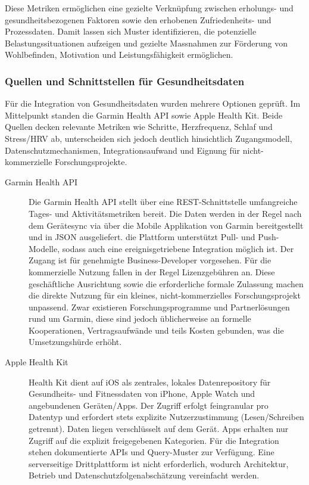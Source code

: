 \documentclass[12pt,a4paper]{report}
\begin{document}
Diese Metriken ermöglichen eine gezielte Verknüpfung zwischen erholungs- und gesundheitsbezogenen Faktoren sowie den erhobenen
Zufriedenheits- und Prozessdaten. Damit lassen sich Muster identifizieren, die potenzielle Belastungssituationen aufzeigen und 
gezielte Massnahmen zur Förderung von Wohlbefinden, Motivation und Leistungsfähigkeit ermöglichen.

\subsubsection{Quellen und Schnittstellen für Gesundheitsdaten}

Für die Integration von Gesundheitsdaten wurden mehrere Optionen geprüft. Im Mittelpunkt standen die Garmin Health API sowie Apple
Health Kit. Beide Quellen decken relevante Metriken wie Schritte, Herzfrequenz, Schlaf und Stress/HRV ab, unterscheiden sich jedoch
deutlich hinsichtlich Zugangsmodell, Datenschutzmechanismen, Integrationsaufwand und Eignung für nicht-kommerzielle 
Forschungsprojekte.

\begin{description}
  \item[Garmin Health API] Die Garmin Health API stellt über eine REST-Schnittstelle umfangreiche Tages- und Aktivitätsmetriken 
    bereit. Die Daten werden in der Regel nach dem Gerätesync via über die Mobile Applikation von Garmin bereitgestellt und in
    JSON ausgeliefert. die Plattform unterstützt Pull- und Push-Modelle, sodass auch eine ereignisgetriebene Integration möglich
    ist. Der Zugang ist für genehmigte Business-Developer vorgesehen. Für die kommerzielle Nutzung fallen in der Regel
    Lizenzgebühren an. Diese geschäftliche Ausrichtung sowie die erforderliche formale Zulassung machen die direkte Nutzung für
    ein kleines, nicht-kommerzielles Forschungsprojekt unpassend. Zwar existieren Forschungsprogramme und Partnerlösungen rund um
    Garmin, diese sind jedoch üblicherweise an formelle Kooperationen, Vertragsaufwände und teils Kosten gebunden, was die
    Umsetzungshürde erhöht.
  \item[Apple Health Kit] Health Kit dient auf iOS als zentrales, lokales Datenrepository für Gesundheits- und Fitnessdaten von 
    iPhone, Apple Watch und angebundenen Geräten/Apps. Der Zugriff erfolgt feingranular pro Datentyp und erfordert stets explizite
    Nutzerzustimmung (Lesen/Schreiben getrennt). Daten liegen verschlüsselt auf dem Gerät. Apps erhalten nur Zugriff auf die
    explizit freigegebenen Kategorien. Für die Integration stehen dokumentierte APIs und Query-Muster zur Verfügung. Eine
    serverseitige Drittplattform ist nicht erforderlich, wodurch Architektur, Betrieb und Datenschutzfolgenabschätzung vereinfacht
    werden.
\end{description}
\end{document}
